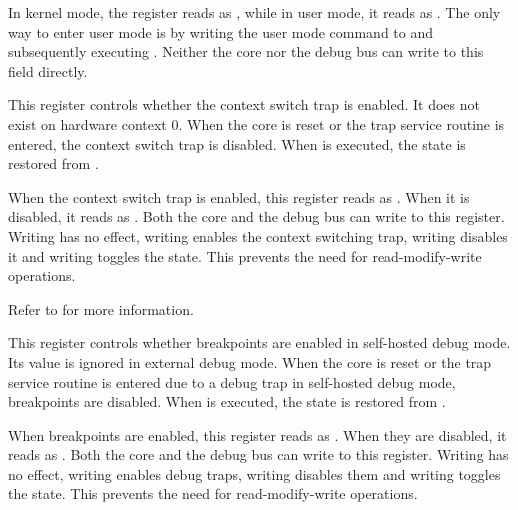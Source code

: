 In kernel mode, the register reads as , while in user mode, it reads as 
. The only way to enter user mode is by writing the user mode command 
to  and subsequently executing . Neither the core nor the 
debug bus can write to this field directly.

\implementation{}

This register controls whether the context switch trap is enabled. It does not 
exist on hardware context 0. When the core is reset or the trap service routine 
is entered, the context switch trap is disabled. When  is executed, 
the state is restored from .

When the context switch trap is enabled, this register reads as . When 
it is disabled, it reads as . Both the core and the debug bus can write 
to this register. Writing  has no effect, writing  enables the 
context switching trap, writing  disables it and writing  
toggles the state. This prevents the need for read-modify-write operations.

Refer to  for more information.

\implementation{}

This register controls whether breakpoints are enabled in self-hosted debug 
mode. Its value is ignored in external debug mode. When the core is reset or the 
trap service routine is entered due to a debug trap in self-hosted debug mode, 
breakpoints are disabled. When  is executed, the state is restored 
from .

When breakpoints are enabled, this register reads as . When they are 
disabled, it reads as . Both the core and the debug bus can write to 
this register. Writing  has no effect, writing  enables debug 
traps, writing  disables them and writing  toggles the state. 
This prevents the need for read-modify-write operations.

